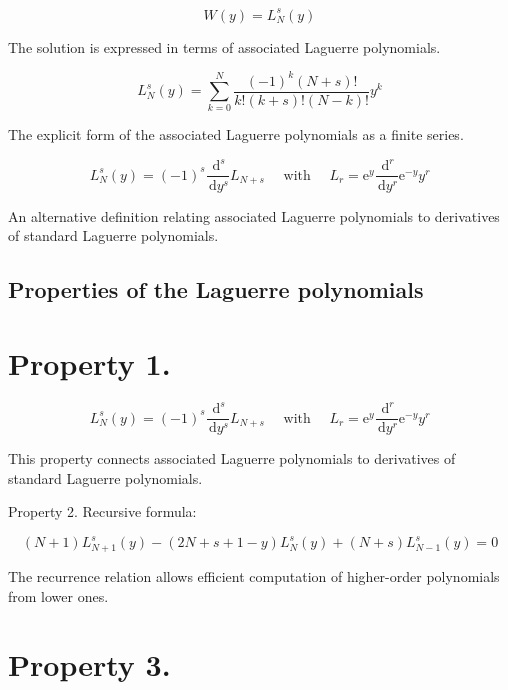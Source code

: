 \documentclass[italian]{HKNdocument}
\begin{document}
\begin{equation}
W(y)=L_{N}^{s}(y) \label{eq:9.72}
\end{equation}

The solution is expressed in terms of associated Laguerre polynomials.

\begin{equation}
L_{N}^{s}(y)=\sum_{k=0}^{N} \frac{(-1)^{k}(N+s)!}{k!(k+s)!(N-k)!} y^{k} \label{eq:9.73}
\end{equation}

The explicit form of the associated Laguerre polynomials as a finite series.

\begin{equation}
L_{N}^{s}(y)=(-1)^{s} \frac{\, \mathrm{d}^{s}}{\, \mathrm{d} y^{s}} L_{N+s} \quad \text { with } \quad L_{r}=\mathrm{e}^{y} \frac{\, \mathrm{d}^{r}}{\, \mathrm{d} y^{r}} \mathrm{e}^{-y} y^{r} \label{eq:9.74}
\end{equation}

An alternative definition relating associated Laguerre polynomials to derivatives of standard Laguerre polynomials.

\subsection{Properties of the Laguerre polynomials}
\section{Property 1.}

\begin{equation}
L_{N}^{s}(y)=(-1)^{s} \frac{\, \mathrm{d}^{s}}{\, \mathrm{d} y^{s}} L_{N+s} \quad \text { with } \quad L_{r}=\mathrm{e}^{y} \frac{\, \mathrm{d}^{r}}{\, \mathrm{d} y^{r}} \mathrm{e}^{-y} y^{r} \label{eq:9.75}
\end{equation}

This property connects associated Laguerre polynomials to derivatives of standard Laguerre polynomials.

Property 2. Recursive formula:

\begin{equation}
(N+1) L_{N+1}^{s}(y)-(2 N+s+1-y) L_{N}^{s}(y)+(N+s) L_{N-1}^{s}(y)=0 \label{eq:9.76}
\end{equation}

The recurrence relation allows efficient computation of higher-order polynomials from lower ones.

\section{Property 3.}
\end{document}
